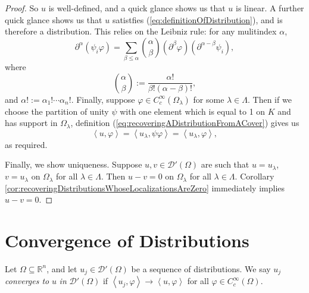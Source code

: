 \documentclass{book}
\newcommand{\scrD}{\mathscr{D}}
\newcommand{\bbR}{\mathbb{R}}
\renewcommand{\phi}{\varphi}
\newcommand{\angles}[1]{\left\langle {#1} \right\rangle}
\theoremstyle{definition}
\theoremstyle{remark}
\numberwithin{equation}{chapter}
\begin{document}
\begin{proof}
    So $u$ is well-defined, and a quick glance shows us that $u$ is linear. A further quick glance shows us that $u$ satistfies (\ref{eq:definitionOfDistribution}), and is therefore a distribution. This relies on the Leibniz rule: for any mulitindex $\alpha$,
    \begin{equation}
        \partial^\alpha(\psi_i \phi) = \sum_{\beta \leq \alpha} {\alpha \choose \beta} (\partial^\beta \phi)(\partial^{\alpha - \beta} \psi_i),
    \end{equation}
    where 
    \begin{equation}
        {\alpha \choose \beta} := \frac{\alpha!}{\beta!(\alpha - \beta)!},
    \end{equation}
    and $\alpha! := \alpha_1 ! \cdots \alpha_n !$. Finally, suppose $\phi \in C_c^\infty(\Omega_\lambda)$ for some $\lambda \in \Lambda$. Then if we choose the partition of unity $\psi$ with one element which is equal to 1 on $K$ and has support in $\Omega_\lambda$, definition (\ref{eq:recoveringADistributionFromACover}) gives us 
    \begin{equation}
        \angles{ u,\phi } = \angles{ u_\lambda, \psi \phi } = \angles{ u_\lambda,\phi },
    \end{equation}
    as required.

    Finally, we show uniqueness. Suppose $u,v \in \scrD'(\Omega)$ are such that $u = u_\lambda$, $v = u_\lambda$ on $\Omega_\lambda$ for all $\lambda \in \Lambda$. Then $u - v = 0$ on $\Omega_\lambda$ for all $\lambda \in \Lambda$. Corollary \ref{cor:recoveringDistributionsWhoseLocalizationsAreZero} immediately implies $u - v = 0$.
\end{proof}

\section{Convergence of Distributions}
Let $\Omega \subseteq \bbR^n$, and let $u_j \in \scrD'(\Omega)$ be a sequence of distributions. We say $u_j$ \textit{converges to} $u$ \textit{in} $\scrD'(\Omega)$ if $\angles{ u_j,\phi } \rightarrow \angles{ u,\phi }$ for all $\phi \in C_c^\infty(\Omega)$.
\end{document}
